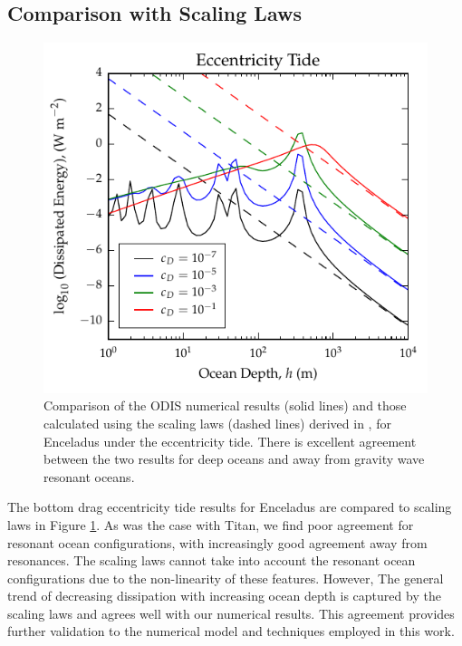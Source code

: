 \subsection{Comparison with Scaling Laws}

\begin{figure}[!t]
\centering
\includegraphics[width=\linewidth]{Figures/enceladus_scaling}
\caption{Comparison of the ODIS numerical results (solid lines) and those calculated using the scaling laws (dashed lines) derived in \citet{chen2013tidal}, for Enceladus under the eccentricity tide. There is excellent agreement between the two results for deep oceans and away from gravity wave resonant oceans. \label{fig:scalEncel}}
\end{figure}

The bottom drag eccentricity tide results for Enceladus are compared to \citet{chen2013tidal} scaling laws in Figure \ref{fig:scalEncel}. As was the case with Titan, we find poor agreement for resonant ocean configurations, with increasingly good agreement away from resonances. The scaling laws cannot take into account the resonant ocean configurations due to the non-linearity of these features. However, The general trend of decreasing dissipation with increasing ocean depth is captured by the scaling laws and agrees well with our numerical results. This agreement provides further validation to the numerical model and techniques employed in this work.

